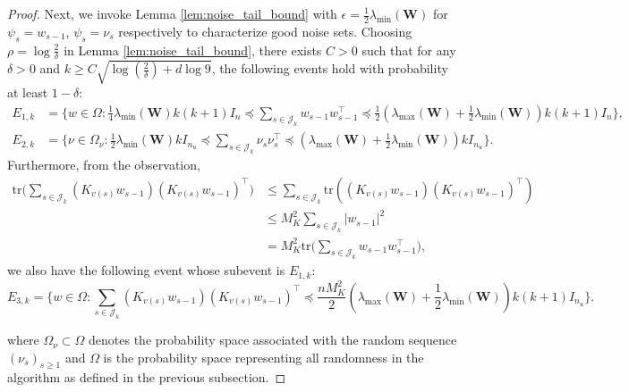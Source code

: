 \documentclass[11pt]{article}
\theoremstyle{plain}
\theoremstyle{definition}
\theoremstyle{remark}
\begin{document}
\begin{proof}
Next, we invoke Lemma \ref{lem:noise_tail_bound} with $\epsilon=\frac{1}{2}\lambda_{\min}(\mathbf{W})$ for $\psi_s = w_{s-1}$, $\psi_s = \nu_{s}$ respectively to characterize good noise sets. 
Choosing $\rho = \log \frac{2}{\delta}$ in Lemma \ref{lem:noise_tail_bound}, there exists $C>0$ such that for any $\delta>0$ and $k\geq C \sqrt{\log (\frac{2}{\delta}) +d\log 9}$, the following events hold with probability at least $1-\delta$:
\begin{align*}
E_{1,k} &= \bigg\{w \in \Omega : \frac{1}{4}\lambda_{\min}(\mathbf{W}) k(k+1) I_{n} \preceq \sum_{s \in\mathcal{J}_k}  w_{s-1} w_{s-1}^{\top} \preceq \frac{1}{2}(\lambda_{\max}(\mathbf{W}) +\frac{1}{2}\lambda_{\min}(\mathbf{W})) k(k+1) I_{n}\bigg\},\\
E_{2,k} &= \bigg\{\nu \in \Omega_{\nu} : \frac{1}{2}\lambda_{\min}(\mathbf{W})k  I_{n_u} \preceq \sum_{s \in\mathcal{J}_k}  \nu_{s} \nu_{s}^{\top} \preceq (\lambda_{\max}(\mathbf{W}) +\frac{1}{2}\lambda_{\min}(\mathbf{W}))k I_{n_u} \bigg\}.
\end{align*}
Furthermore, from the observation,
\begin{equation*}
\begin{split}
\mathrm{tr}\bigg(\sum_{s \in\mathcal{J}_k} (K_{v(s)} w_{s-1}) (K_{v(s)}w_{s-1})^\top\bigg) &\leq \sum_{s \in\mathcal{J}_k} \mathrm{tr} ((K_{v(s)} w_{s-1}) (K_{v(s)}w_{s-1})^\top)\\
&\leq M_K^2 \sum_{s \in\mathcal{J}_k} |w_{s-1}|^2 \\
&= M_K^2 \mathrm{tr}\bigg(\sum_{s \in\mathcal{J}_k} w_{s-1}w_{s-1}^\top\bigg),
\end{split}
\end{equation*}
we also have the following event {whose subevent is $E_{1,k}$}:
\[E_{3,k} =\bigg \{w \in \Omega :  \sum_{s \in\mathcal{J}_k}  (K_{v(s)} w_{s-1})(K_{v(s)} w_{s-1})^{\top} \preceq \frac{n M_K^2}{2}(\lambda_{\max}(\mathbf{W}) +\frac{1}{2}\lambda_{\min}(\mathbf{W})) k(k+1) I_{n_u}\bigg\}.\]

where $\Omega_\nu \subset \Omega$ denotes the probability space associated with the random sequence $(\nu_s)_{s\geq 1}$ and $\Omega$ is the probability space representing all randomness in the algorithm as defined in the previous subsection. 


\end{proof}
\end{document}
